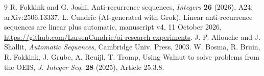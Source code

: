 \documentclass[11pt]{article}
\theoremstyle{remark}\newtheorem{remark}[theorem]{Remark}
\theoremstyle{definition}\newtheorem{definition}[theorem]{Definition}
\begin{document}
\begin{thebibliography}{9}
 R. Fokkink and G. Joshi, Anti-recurrence sequences, \emph{Integers} \textbf{26} (2026), A24; arXiv:2506.13337.
 L. Cundric (AI-generated with Grok), Linear anti-recurrence sequences are linear plus automatic, manuscript v4, 11 October 2026, \url{https://github.com/LarsenCundric/ai-research-experiments}.
 J.-P. Allouche and J. Shallit, \emph{Automatic Sequences}, Cambridge Univ. Press, 2003.
 W. Bosma, R. Bruin, R. Fokkink, J. Grube, A. Reuijl, T. Tromp, Using Walnut to solve problems from the OEIS, \emph{J. Integer Seq.} \textbf{28} (2025), Article 25.3.8.
\end{thebibliography}
\end{document}
